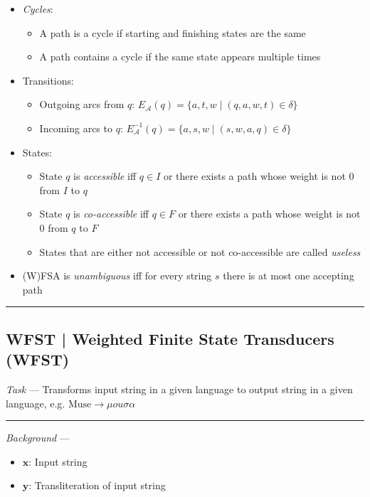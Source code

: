 \begin{itemize}
    \item \emph{Cycles}:
    \begin{itemize}
        \item A path is a cycle if starting and finishing states are the same
        \item A path contains a cycle if the same state appears multiple times
    \end{itemize}

    \item Transitions:
    \begin{itemize}
        \item Outgoing arcs from $q$: $E_\mathcal{A} (q) = \{a, t, w \mid (q, a, w, t) \in \delta\}$
        \item Incoming arcs to $q$: $E_\mathcal{A}^{-1} (q) = \{a, s, w \mid (s, w, a, q) \in \delta\}$
    \end{itemize}

    \item States:
    \begin{itemize}
        \item State $q$ is \emph{accessible} iff $q \in I$ or there exists a path whose weight is not 0 from $I$ to $q$
        \item State $q$ is \emph{co-accessible} iff $q \in F$ or there exists a path whose weight is not 0 from $q$ to $F$
        \item States that are either not accessible or not co-accessible are called \emph{useless}
    \end{itemize}

    \item (W)FSA is \emph{unambiguous} iff for every string $s$ there is at most one accepting path
\end{itemize}

{\color{black}\hrule height 0.001mm}

\subsection*{WFST | Weighted Finite State Transducers (WFST)}
\emph{Task} --- Transforms input string in a given language to output string in a given language, e.g. $\textrm{Muse} \to \mu ou \sigma \alpha$

{\color{lightgray}\hrule height 0.001mm}

\emph{Background} ---
\begin{itemize}
    \item $\boldsymbol{x}$: Input string
    \item $\boldsymbol{y}$: Transliteration of input string
\end{itemize}

